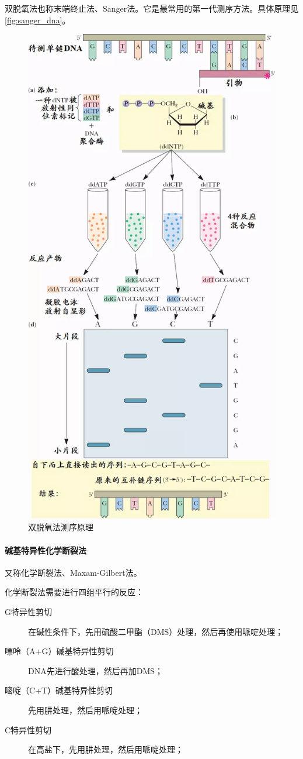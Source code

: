 双脱氧法也称末端终止法、Sanger法。它是最常用的第一代测序方法。具体原理见\autoref{fig:sanger_dna}。

\begin{figure}[p]
	\centering
	\includegraphics[width=0.7\linewidth]{Pics/Sanger法DNA测序}
	\caption{双脱氧法测序原理}
	\label{fig:sanger_dna}
\end{figure}

\paragraph{碱基特异性化学断裂法}

又称化学断裂法、Maxam-Gilbert法。

化学断裂法需要进行四组平行的反应：

\begin{description}
	\item[G特异性剪切] 在碱性条件下，先用硫酸二甲酯（DMS）处理，然后再使用哌啶处理；
	\item[嘌呤（A+G）碱基特异性剪切] DNA先进行酸处理，然后再加DMS；
	\item[嘧啶（C+T）碱基特异性剪切] 先用肼处理，然后用哌啶处理；
	\item[C特异性剪切] 在高盐下，先用肼处理，然后用哌啶处理；
\end{description}

